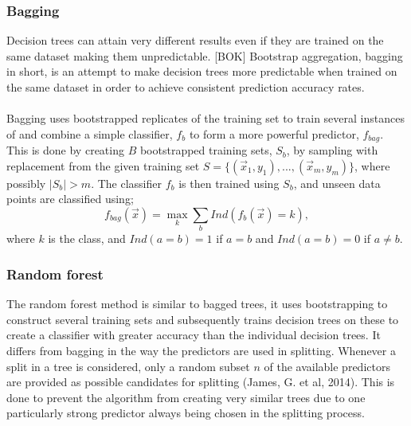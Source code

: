 \documentclass{article}
\begin{document}
\subsubsection{Bagging}
Decision trees can attain very different results even if they are trained on the same dataset making them unpredictable. [BOK] Bootstrap aggregation, bagging in short, is an attempt to make decision trees more predictable when trained on the same dataset in order to achieve consistent prediction accuracy rates. \\ \\
Bagging uses bootstrapped replicates of the training set to train several instances of and combine a simple classifier, $f_b$ to form a more powerful predictor, $f_{bag}$. This is done by creating $B$ bootstrapped training sets, $S_b$, by sampling with replacement from the given training set $S = \{ (\vec{x}_1, y_1), ..., (\vec{x}_m, y_m)\}$, where possibly $|S_b| > m$. The classifier $f_b$ is then trained using $S_b$, and unseen data points are classified using; 
\begin{equation}
f_{bag}(\vec{x}) = \max\limits_k \sum\limits_b Ind(f_b(\vec{x}) = k),
\end{equation}
where $k$ is the class, and $Ind(a = b) = 1$ if $a = b$ and $Ind(a = b) = 0$ if $a \ne b$.

\subsubsection{Random forest}
The random forest method is similar to bagged trees, it uses bootstrapping to construct several training sets and subsequently trains decision trees on these to create a classifier with greater accuracy than the individual decision trees. It differs from bagging in the way the predictors are used in splitting. Whenever a split in a tree is considered, only a random subset $n$ of the available predictors are provided as possible candidates for splitting (James, G. et al, 2014). This is done to prevent the algorithm from creating very similar trees due to one particularly strong predictor always being chosen in the splitting process.
 
\end{document}
